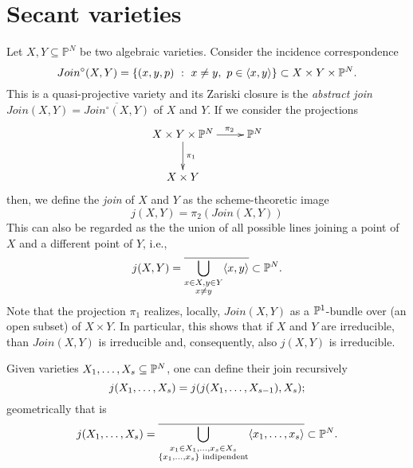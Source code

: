  
\section{Secant varieties}
\label{classicalAG-section-secants}

\begin{definition}
\label{classicalAG-definition-join}
Let $X,Y \subseteq \mathbb{P}^N$ be two algebraic varieties. Consider the incidence correspondence 
\[
    Join^\circ(X,Y) = \{(x,y,p) ~:~ x \neq y,~p \in \langle x,y \rangle\} \subset X \times Y \times \mathbb{P}^N.
\]
This is a quasi-projective variety and its Zariski closure is the \emph{abstract join} $Join(X,Y) = \overline{Join^\circ(X,Y)}$ of $X$ and $Y$. If we consider the projections 
\[
    \xymatrix{
        X \times Y \times \bbP^N \ar[d]^{\pi_1} \ar[r]^(0.65){\pi_2} & \bbP^N\\
        X \times Y & 
    }
\]
then, we define the \emph{join} of $X$ and $Y$ as the scheme-theoretic image 
\[
    j(X,Y) = \pi_2(Join(X,Y))
\]
This can also be regarded as the the union of all possible lines joining a point of $X$ and a different point of $Y$, i.e.,
\[
    j(X,Y) = \overline{ \bigcup_{\substack{x \in X, y \in Y \\ x \neq y}} \langle x,y \rangle} \subset \mathbb{P}^N.
\]
Note that the projection $\pi_1$ realizes, locally, $Join(X,Y)$ as a $\mathbb{P}^1$-bundle over (an open subset) of $X \times Y$. In particular, this shows that if $X$ and $Y$ are irreducible, than $Join(X,Y)$ is irreducible and, consequently, also $j(X,Y)$ is irreducible.

Given varieties $X_1 , \ldots , X_s \subseteq \mathbb{P}^N$, one can define their join recursively
\[
    j( X_1 , \ldots , X_s) = j( j(X_1 , \ldots , X_{s-1}), X_s);
\]
geometrically that is 
\[
    j( X_1 , \ldots , X_s) = \overline{\bigcup_{\substack{x_1 \in X_1,\ldots,x_s \in X_s \\ \{x_1,\ldots,x_s\} \text{ indipendent}}} \langle x_1,\ldots,x_s \rangle} \subset \mathbb{P}^N.
\]
\end{definition}
